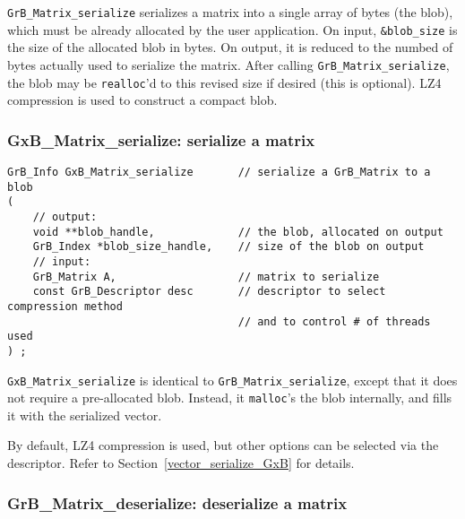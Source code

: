 \documentclass[12pt]{article}
\begin{document}
\verb'GrB_Matrix_serialize' serializes a matrix into a single array of bytes
(the blob), which must be already allocated by the user application.
On input, \verb'&blob_size' is the size of the allocated blob in bytes.
On output, it is reduced to the numbed of bytes actually used to serialize
the matrix.  After calling \verb'GrB_Matrix_serialize', the blob may be
\verb'realloc''d to this revised size if desired (this is optional).
LZ4 compression is used to construct a compact blob.

\newpage
\subsubsection{{\sf GxB\_Matrix\_serialize:}      serialize a matrix}
\label{matrix_serialize_GxB}

\begin{mdframed}[userdefinedwidth=6in]
{\footnotesize
\begin{verbatim}
GrB_Info GxB_Matrix_serialize       // serialize a GrB_Matrix to a blob
(
    // output:
    void **blob_handle,             // the blob, allocated on output
    GrB_Index *blob_size_handle,    // size of the blob on output
    // input:
    GrB_Matrix A,                   // matrix to serialize
    const GrB_Descriptor desc       // descriptor to select compression method
                                    // and to control # of threads used
) ;
\end{verbatim}
} \end{mdframed}

\verb'GxB_Matrix_serialize' is identical to \verb'GrB_Matrix_serialize', except
that it does not require a pre-allocated blob.  Instead, it \verb'malloc''s the
blob internally, and fills it with the serialized vector.

By default, LZ4 compression is used, but other options can be selected
via the descriptor.  Refer to Section~\ref{vector_serialize_GxB} for details.

\subsubsection{{\sf GrB\_Matrix\_deserialize:}    deserialize a matrix}
\label{matrix_deserialize}
\end{document}
